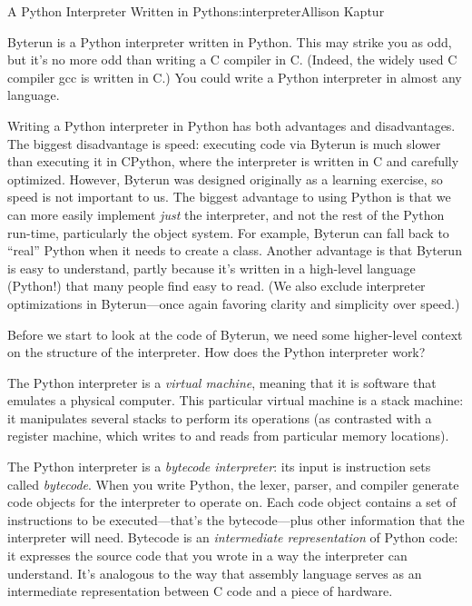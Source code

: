 \begin{aosachapter}{A Python Interpreter Written in Python}{s:interpreter}{Allison Kaptur}
\label{a-python-python-interpreter}

Byterun is a Python interpreter written in Python. This may strike you
as odd, but it's no more odd than writing a C compiler in C. (Indeed,
the widely used C compiler gcc is written in C.) You could write a
Python interpreter in almost any language.

Writing a Python interpreter in Python has both advantages and
disadvantages. The biggest disadvantage is speed: executing code via
Byterun is much slower than executing it in CPython, where the
interpreter is written in C and carefully optimized. However, Byterun
was designed originally as a learning exercise, so speed is not
important to us. The biggest advantage to using Python is that we can
more easily implement \emph{just} the interpreter, and not the rest of
the Python run-time, particularly the object system. For example,
Byterun can fall back to ``real'' Python when it needs to create a
class. Another advantage is that Byterun is easy to understand, partly
because it's written in a high-level language (Python!) that many people
find easy to read. (We also exclude interpreter optimizations in
Byterun---once again favoring clarity and simplicity over speed.)

\label{building-an-interpreter}

Before we start to look at the code of Byterun, we need some
higher-level context on the structure of the interpreter. How does the
Python interpreter work?

The Python interpreter is a \emph{virtual machine}, meaning that it is
software that emulates a physical computer. This particular virtual
machine is a stack machine: it manipulates several stacks to perform its
operations (as contrasted with a register machine, which writes to and
reads from particular memory locations).

The Python interpreter is a \emph{bytecode interpreter}: its input is
instruction sets called \emph{bytecode}. When you write Python, the
lexer, parser, and compiler generate code objects for the interpreter to
operate on. Each code object contains a set of instructions to be
executed---that's the bytecode---plus other information that the
interpreter will need. Bytecode is an \emph{intermediate representation}
of Python code: it expresses the source code that you wrote in a way the
interpreter can understand. It's analogous to the way that assembly
language serves as an intermediate representation between C code and a
piece of hardware.


\end{aosachapter}
